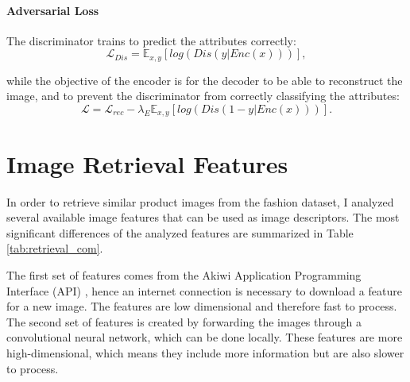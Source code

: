\documentclass[12pt]{report}
\begin{document}
\paragraph{Adversarial Loss}
The discriminator trains to predict the attributes correctly:
\begin{equation}
\mathcal{L}_{Dis} = \mathbb{E}_{x,y}[log(Dis(y|Enc(x)))],
\end{equation}

while the objective of the encoder is for the decoder to be able to reconstruct the image, and to prevent the discriminator from correctly classifying the attributes:
\begin{equation}
\mathcal{L} = \mathcal{L}_{rec} - \lambda_E \mathbb{E}_{x,y}[log(Dis(1-y|Enc(x)))].
\end{equation}


\pagebreak
\section{Image Retrieval Features}
In order to retrieve similar product images from the fashion dataset, I analyzed several available image features that can be used as image descriptors. The most significant differences of the analyzed features are summarized in Table \ref{tab:retrieval_com}. 

The first set of features comes from the Akiwi Application Programming Interface (API) \cite{sonnenberg_akiwi_nodate}, hence an internet connection is necessary to download a feature for a new image. The features are low dimensional and therefore fast to process. The second set of features is created by forwarding the images through a convolutional neural network, which can be done locally. These features are more high-dimensional, which means they include more information but are also slower to process.
\end{document}
